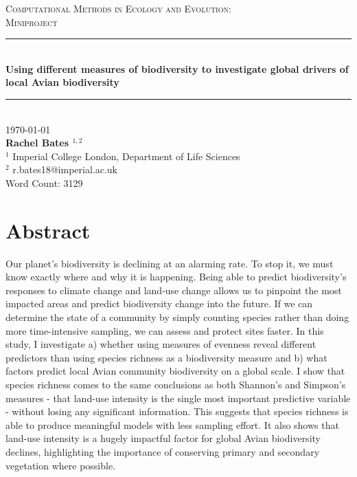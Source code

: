 \documentclass[11pt]{article}
\newcommand{\HRule}[1]{\rule{\linewidth}{#1}} 	%
\begin{document}
\begin{titlepage}
\vspace*{0.05\textheight}
\centering
    \normalsize \textsc{\large Computational Methods in Ecology and Evolution:\\[0.4cm] Miniproject} 	%
    \\[1.0cm]								%
	\HRule{0.5pt} \\ [0.5cm]					%
	\LARGE \textbf{Using different measures of biodiversity to investigate global drivers of local Avian biodiversity} \\[0.2cm]	%
	\HRule{0.5pt}     %
	\\ [1.0cm]		 %
	\normalsize \today
	\\[2.0cm]
    \textbf{\Large{Rachel Bates $^{1,2}$}}
    \\[0.5cm]
    \normalsize $^1$ Imperial College London, Department of Life Sciences
    \\ $^2$ r.bates18@imperial.ac.uk
    \\\vfill
    Word Count: 3129
    \vspace*{0.02\textheight}
\end{titlepage}
\newpage
\linenumbers  %

\section*{Abstract}

Our planet's biodiversity is declining at an alarming rate. To stop it, we must know exactly where and why it is happening. Being able to predict biodiversity's responses to climate change and land-use change allows us to pinpoint the most impacted areas and predict biodiversity change into the future. If we can determine the state of a community by simply counting species rather than doing more time-intensive sampling, we can assess and protect sites faster.
In this study, I investigate a) whether using measures of evenness reveal different predictors than using species richness as a biodiversity measure and b) what factors predict local Avian community biodiversity on a global scale. I show that species richness comes to the same conclusions as both Shannon's and Simpson's measures - that land-use intensity is the single most important predictive variable - without losing any significant information. This suggests that species richness is able to produce meaningful models with less sampling effort. It also shows that land-use intensity is a hugely impactful factor for global Avian biodiversity declines, highlighting the importance of conserving primary and secondary vegetation where possible.
\end{document}
